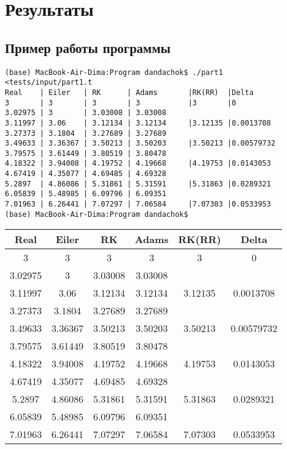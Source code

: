 \section*{Результаты}

\subsection*{Пример работы программы}

\begin{lstlisting}
(base) MacBook-Air-Dima:Program dandachok$ ./part1 <tests/input/part1.t
Real    | Eiler   | RK      | Adams       |RK(RR)  |Delta
3       | 3       | 3       | 3           |3       |0
3.02975 | 3       | 3.03008 | 3.03008    
3.11997 | 3.06    | 3.12134 | 3.12134     |3.12135 |0.0013708
3.27373 | 3.1804  | 3.27689 | 3.27689       
3.49633 | 3.36367 | 3.50213 | 3.50203     |3.50213 |0.00579732
3.79575 | 3.61449 | 3.80519 | 3.80478
4.18322 | 3.94008 | 4.19752 | 4.19668     |4.19753 |0.0143053
4.67419 | 4.35077 | 4.69485 | 4.69328
5.2897  | 4.86086 | 5.31861 | 5.31591     |5.31863 |0.0289321
6.05839 | 5.48985 | 6.09796 | 6.09351
7.01963 | 6.26441 | 7.07297 | 7.06584     |7.07303 |0.0533953
(base) MacBook-Air-Dima:Program dandachok$
\end{lstlisting}

\begin{tabular}{ | c | c | c | c | c | c |}
    \hline
    Real & Eiler & RK & Adams & RK(RR) & Delta \\
    \hline
    3       & 3       & 3       & 3        &3       & 0 \\
    3.02975 & 3       & 3.03008 & 3.03008 & & \\
    3.11997 & 3.06    & 3.12134 & 3.12134 &3.12135 & 0.0013708 \\
    3.27373 & 3.1804  & 3.27689 & 3.27689 & & \\
    3.49633 & 3.36367 & 3.50213 & 3.50203 &3.50213 & 0.00579732 \\
    3.79575 & 3.61449 & 3.80519 & 3.80478 & & \\
    4.18322 & 3.94008 & 4.19752 & 4.19668 & 4.19753 & 0.0143053 \\
    4.67419 & 4.35077 & 4.69485 & 4.69328 & & \\
    5.2897  & 4.86086 & 5.31861 & 5.31591 & 5.31863 & 0.0289321 \\
    6.05839 & 5.48985 & 6.09796 & 6.09351 & & \\
    7.01963 & 6.26441 & 7.07297 & 7.06584 &7.07303 & 0.0533953 \\
    \hline
\end{tabular}

\pagebreak